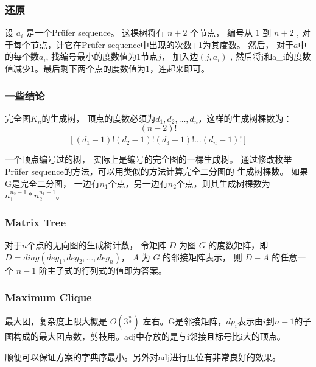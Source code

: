 \subsubsection{还原}
设 $a_i$ 是一个Prüfer sequence。
这棵树将有 $n + 2$ 个节点， 编号从 $1$ 到 $n + 2$ , 对于每个节点，计它在Prüfer sequence中出现的次数+1为其度数。
然后， 对于$a$中的每个数$a_i$, 找编号最小的度数值为1节点$j$， 加入边$(j,a_i)$ , 然后将j和a_i的度数值减少1。最后剩下两个点的度数值为1，连起来即可。

\subsubsection{一些结论}
完全图$K_n$的生成树， 顶点的度数必须为$d_1, d_2, \ldots, d_n$，这样的生成树棵数为：
$$ \frac{(n-2)!}{[(d_1 - 1)! (d_2 - 1)! (d_3 - 1)! \ldots (d_n - 1)!]} $$

一个顶点编号过的树， 实际上是编号的完全图的一棵生成树。 通过修改枚举Prüfer sequence的方法，可以用类似的方法计算完全二分图的
生成树棵数。 如果G是完全二分图， 一边有$n_1$个点，另一边有$n_2$个点，则其生成树棵数为 $n_1 ^ {n_2 - 1} * n_2 ^ {n_1 - 1}$。

\subsubsection{Matrix Tree}
对于$n$个点的无向图的生成树计数，
令矩阵 $D$ 为图 $G$ 的度数矩阵，即 $ D = diag(deg_1,deg_2, \ldots , deg_n) $， $A$ 为 $G$ 的邻接矩阵表示，
则 $ D - A $ 的任意一个 $n-1$ 阶主子式的行列式的值即为答案。

\subsubsection{Maximum Clique}
最大团，复杂度上限大概是 $ O(3^{\frac{n}{3}}) $ 左右。G是邻接矩阵，$dp_i$表示由$i$到$n-1$的子图构成的最大团点数，剪枝用。adj中存放的是与i邻接且标号比i大的顶点。

顺便可以保证方案的字典序最小。另外对adj进行压位有非常良好的效果。




